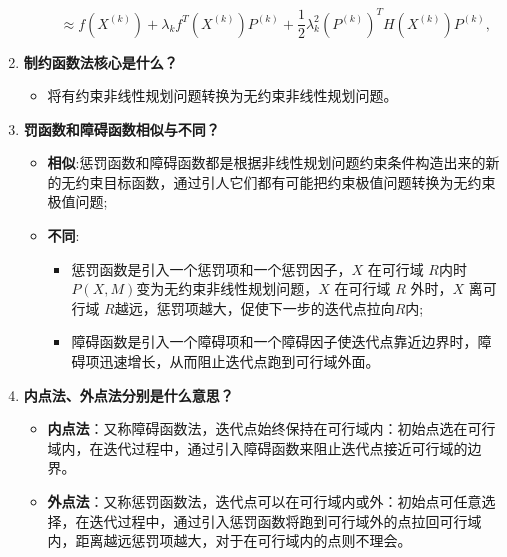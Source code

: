 \begin{enumerate}
\begin{itemize}
			\[
			\approx f(X^{(k)}) + \lambda_k f^T(X^{(k)}) P^{(k)} + \frac{1}{2} \lambda_k^2 (P^{(k)})^T H(X^{(k)}) P^{(k)},
			\]
		\end{itemize}
		\item \textbf{制约函数法核心是什么？ }
		\begin{itemize}
			\item 将有约束非线性规划问题转换为无约束非线性规划问题。
		\end{itemize}
		\item \textbf{罚函数和障碍函数相似与不同？}
		\begin{itemize}
			\item \textbf{相似}:惩罚函数和障碍函数都是根据非线性规划问题约束条件构造出来的新的无约束目标函数，通过引人它们都有可能把约束极值问题转换为无约束极值问题;
			\item \textbf{不同}:
			\begin{itemize}
				\item 惩罚函数是引入一个惩罚项和一个惩罚因子，$X$ 在可行域 $R$内时$P(X,M)$变为无约束非线性规划问题，$X$ 在可行域 $R$ 外时，$X$ 离可行域 $R$越远，惩罚项越大，促使下一步的迭代点拉向$R$内;
			    \item 障碍函数是引入一个障碍项和一个障碍因子使迭代点靠近边界时，障碍项迅速增长，从而阻止迭代点跑到可行域外面。
			\end{itemize}
		\end{itemize}
		\item \textbf{内点法、外点法分别是什么意思？}
		\begin{itemize}
			\item \textbf{内点法}：又称障碍函数法，迭代点始终保持在可行域内：初始点选在可行域内，在迭代过程中，通过引入障碍函数来阻止迭代点接近可行域的边界。
			\item \textbf{外点法}：又称惩罚函数法，迭代点可以在可行域内或外：初始点可任意选择，在迭代过程中，通过引入惩罚函数将跑到可行域外的点拉回可行域内，距离越远惩罚项越大，对于在可行域内的点则不理会。
		\end{itemize}
	\end{enumerate}
